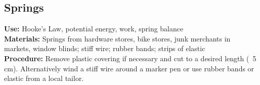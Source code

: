 \begin{multicols}{2}

\section{Springs}
\label{sec:springs}
\vspace{-10pt}
\textbf{Use:} Hooke's Law, potential energy, work, spring balance\\
\textbf{Materials:} Springs from hardware stores, bike stores, junk merchants in markets, window blinds; stiff wire; rubber bands; strips of elastic\\
\textbf{Procedure:} Remove plastic covering if necessary and cut to a desired length (~5 cm). Alternatively wind a stiff wire around a marker pen or use rubber bands or elastic from a local tailor.


\end{multicols}
